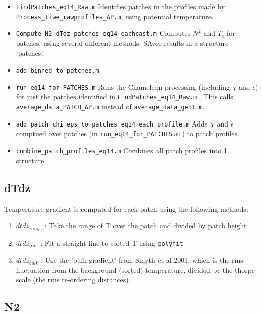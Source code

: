 \documentclass[11pt]{article}
\begin{document}
\begin{itemize}

\item \verb+FindPatches_eq14_Raw.m+ Identifies patches in the profiles made by \verb+Process_tiwe_rawprofiles_AP.m+, using potential temperature.

\item \verb+Compute_N2_dTdz_patches_eq14_eachcast.m+ Computes $N^2$ and $T_z$ for patches, using several different methods. SAves results in a structure `patches'.

\item \verb+add_binned_to_patches.m+

\item \verb+run_eq14_for_PATCHES.m+ Runs the Chameleon processing (including $\chi$ and $\epsilon$) for just the patches identified in \verb+FindPatches_eq14_Raw.m+ . This calls \verb+average_data_PATCH_AP.m+ instead of \verb+average_data_gen1.m+.

\item \verb+add_patch_chi_eps_to_patches_eq14_each_profile.m+ Adds  $\chi$ and $\epsilon$ comptued over patches (in \verb+run_eq14_for_PATCHES.m+ ) to patch profiles.

\item \verb+combine_patch_profiles_eq14.m+ Combines all patch profiles into 1 structure.


\end{itemize}

\medskip

\subsection{dTdz}

Temperature gradient is computed for each patch using the following methods:
\begin{enumerate}
\item $dtdz_{range}$ : Take the range of T over the patch and divided by patch height
\item $dtdz_{line}$ : Fit a straight line to sorted T using \verb+polyfit+
\item $dtdz_{bulk}$ : Use the 'bulk gradient' from Smyth et al 2001, which is the rms fluctuation from the background (sorted) temperature, divided by the thorpe scale (the rms re-ordering distances).
\end{enumerate}


\subsection{N2}
\end{document}
